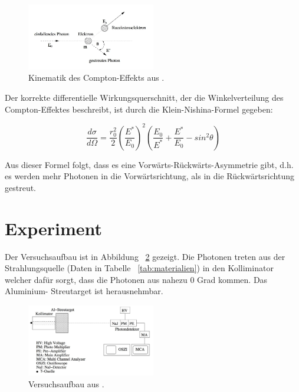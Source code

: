 \documentclass[aps,twocolumn,secnumarabic,nobalancelastpage,amsmath,amssymb,
nofootinbib,superscriptaddress]{revtex4-1}
\begin{document}
\begin{figure}[h]
  \centering
  \includegraphics[width=0.5\textwidth]{comptstreu_schema.jpg}
  \caption{\label{fig:kinematik} Kinematik des Compton-Effekts aus \cite{skript07}.}
\end{figure}

Der korrekte differentielle Wirkungsquerschnitt, der die Winkelverteilung des
Compton-Effektes beschreibt, ist durch die Klein-Nishina-Formel gegeben:

  \begin{equation}
    \frac{d \sigma}{d \Omega} = \frac{r_0^2}{2} \left( \frac{E^*}{E_0} \right)^2
    \left( \frac{E_0}{E^*} + \frac{E^*}{E_0} - sin^2 \theta    \right)
    \label{eq:kleinnishina}
  \end{equation}

Aus dieser Formel folgt, dass es eine Vorwärts-Rückwärts-Asymmetrie gibt, d.h.
es werden mehr Photonen in die Vorwärtsrichtung, als in die Rückwärtsrichtung
gestreut.


\section{Experiment}
Der Versuchsaufbau ist in Abbildung ~\cref{fig:aufbau} gezeigt. Die Photonen treten
aus der Strahlungsquelle (Daten in Tabelle ~\cref{tab:materialien}) in den Kolliminator
welcher dafür sorgt, dass die Photonen aus nahezu 0 Grad kommen. Das Aluminium-
Streutarget ist herausnehmbar.

\begin{figure}[h]
  \centering
  \includegraphics[width=0.5\textwidth]{aufbau.jpeg}
  \caption{\label{fig:aufbau} Versuchsaufbau aus \cite{skript07}.}
\end{figure}
\end{document}
